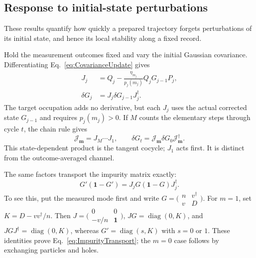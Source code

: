 \documentclass[aps,prb,10pt,twocolumn,superscriptaddress,longbibliography,floatfix]{revtex4-2}
\newcommand{\rec}{\mathbf m}   %
\newcommand{\newtext}[1]{{\color{blue}#1}}
\begin{document}
{\color{blue}
\subsection{Response to initial-state perturbations}
\label{app:TrajectoryResponse}
\newtext{These results quantify how quickly a prepared trajectory forgets perturbations of its initial state, and hence its local stability along a fixed record.}

Hold the measurement outcomes fixed and vary the initial Gaussian covariance. Differentiating Eq.~\eqref{eq:CovarianceUpdate} gives
\begin{align}
 J_j&=Q_j-\frac{\eta_{m_j}}{p_j(m_j)}Q_jG_{j-1}P_j,\nonumber\\
 \delta G_j&=J_j\delta G_{j-1}J_j^\dagger.
 \label{eq:BranchCovarianceTangent}
\end{align}
The target occupation adds no derivative, but each $J_j$ uses the actual corrected state $G_{j-1}$ and requires $p_j(m_j)>0$. If $M$ counts the elementary steps through cycle $t$, the chain rule gives
\begin{equation}
 \mathcal J_{\rec}=J_M\cdots J_1,\qquad
 \delta G_t=\mathcal J_{\rec}\delta G_0\mathcal J_{\rec}^\dagger.
 \label{eq:CovarianceTangentProduct}
\end{equation}
This state-dependent product is the tangent cocycle; $J_1$ acts first. It is distinct from the outcome-averaged channel.

The same factors transport the impurity matrix exactly:
\begin{equation}
 G'(\mathbf1-G')=J_jG(\mathbf1-G)J_j^\dagger.
 \label{eq:ImpurityTransport}
\end{equation}
To see this, put the measured mode first and write $G=\bigl(\begin{smallmatrix}n&v^\dagger\\v&D\end{smallmatrix}\bigr)$. For $m=1$, set $K=D-vv^\dagger/n$. Then $J=\bigl(\begin{smallmatrix}0&0\\-v/n&\mathbf1\end{smallmatrix}\bigr)$, $JG=\operatorname{diag}(0,K)$, and $JGJ^\dagger=\operatorname{diag}(0,K)$, whereas $G'=\operatorname{diag}(s,K)$ with $s=0$ or $1$. These identities prove Eq.~\eqref{eq:ImpurityTransport}; the $m=0$ case follows by exchanging particles and holes.

}
\end{document}
